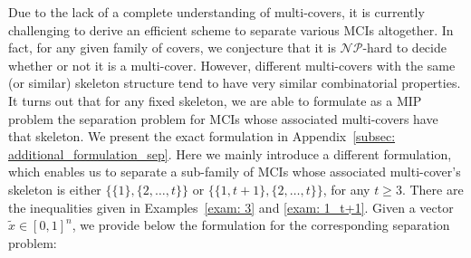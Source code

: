 Due to the lack of a complete understanding of multi-covers, it is currently challenging to derive an efficient scheme to separate various MCIs altogether. 
In fact, for any given family of covers, we conjecture that it is $\mathcal{NP}$-hard to decide whether or not it is a multi-cover.
However, different multi-covers with the same (or similar) skeleton structure tend to have very similar combinatorial properties.
It turns out that for any fixed skeleton, we are able to formulate as a MIP problem the separation problem for MCIs whose associated multi-covers have that skeleton. 
We present the exact formulation in Appendix~\ref{subsec: additional_formulation_sep}. Here we mainly introduce a different formulation, which enables us to separate a sub-family of MCIs whose associated multi-cover's skeleton is either $\{\{1\}, \{2, \ldots, t\}\}$ or $\{\{1,t+1\}, \{2, \ldots, t\}\}$, for any $t \geq 3$.  There are the inequalities given in Examples~\ref{exam: 3} and \ref{exam: 1_t+1}. 
Given a vector $\tilde x \in [0,1]^n$, we provide below the formulation for the corresponding separation problem:



